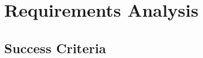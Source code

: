 



\section{Requirements Analysis}
\label{sec:2.5}

\subsection{Success Criteria}
\label{sec:2.5.1}


